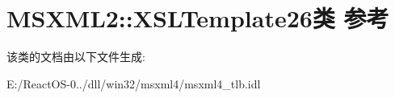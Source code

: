 \hypertarget{class_m_s_x_m_l2_1_1_x_s_l_template26}{}\section{M\+S\+X\+M\+L2\+:\+:X\+S\+L\+Template26类 参考}
\label{class_m_s_x_m_l2_1_1_x_s_l_template26}


该类的文档由以下文件生成\+:\begin{DoxyCompactItemize}
\item 
E\+:/\+React\+O\+S-\/0../dll/win32/msxml4/msxml4\+\_\+tlb.\+idl\end{DoxyCompactItemize}
